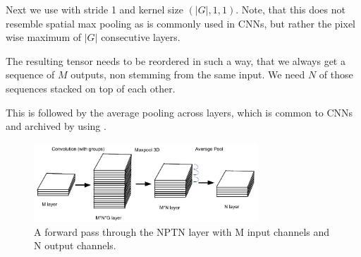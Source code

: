 \documentclass{llncs}
\begin{document}

Next we use \nnMaxPool with stride 1 and kernel size $(|G|,1,1)$. Note, that this does not resemble spatial max pooling as is commonly used in CNNs, but rather the pixel wise maximum of $|G|$ consecutive layers.

The resulting tensor needs to be reordered in such a way, that we always get a sequence of $M$ outputs, non stemming from the same input. We need $N$ of those sequences stacked on top of each other.

This is followed by the average pooling across layers, which is common to CNNs and archived by using \nnAvgPool.

\begin{figure}
	\begin{center}
		\includegraphics[width=0.75\textwidth]{result_images/NptnImplementation.png}
		\caption{A forward pass through the NPTN layer with M input channels and N output channels.}
		\label{fig:NptnImplementation}
	\end{center}
\end{figure}
\end{document}
